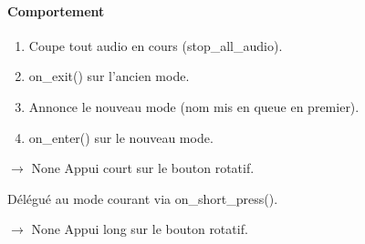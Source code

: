 \documentclass[letterpaper,10pt,french]{sphinxmanual}
\begin{document}
\begin{fulllineitems}
\begin{fulllineitems}
\begin{description}
\end{description}


\paragraph{Comportement}
\label{\detokenize{api/core:comportement}}\begin{enumerate}
%
\item {} 
\sphinxAtStartPar
Coupe tout audio en cours (stop\_all\_audio).

\item {} 
\sphinxAtStartPar
on\_exit() sur l’ancien mode.

\item {} 
\sphinxAtStartPar
Annonce le nouveau mode (nom mis en queue en premier).

\item {} 
\sphinxAtStartPar
on\_enter() sur le nouveau mode.

\end{enumerate}

\end{fulllineitems}


\begin{fulllineitems}
\label{\detokenize{api/core:core.mode_manager.ModeManager.handle_short_press}}
\pysigstartsignatures
\pysiglinewithargsret
{}
{}
{{ $\rightarrow$ None}}
\pysigstopsignatures
\sphinxAtStartPar
Appui court sur le bouton rotatif.

\sphinxAtStartPar
Délégué au mode courant via on\_short\_press().

\end{fulllineitems}


\begin{fulllineitems}
\label{\detokenize{api/core:core.mode_manager.ModeManager.handle_long_press}}
\pysigstartsignatures
\pysiglinewithargsret
{}
{}
{{ $\rightarrow$ None}}
\pysigstopsignatures
\sphinxAtStartPar
Appui long sur le bouton rotatif.


\end{fulllineitems}
\end{fulllineitems}
\end{document}
